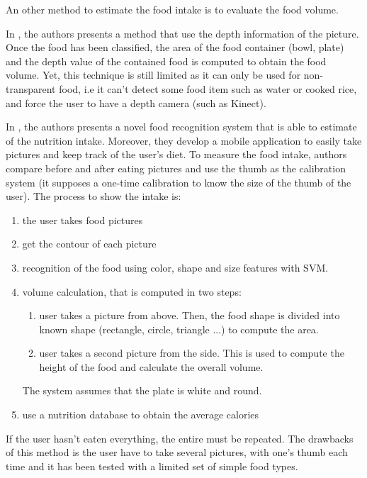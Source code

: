 
An other method to estimate the food intake is to evaluate the food volume.

In \cite{Chen2012}, the authors presents a method that use the depth information of the picture. Once the food has been classified, the area of the food container (bowl, plate) and the depth value of the contained food is computed to obtain the food volume.
Yet, this technique is still limited as it can only be used for non-transparent food, i.e it can't detect some food item such as water or cooked rice, and force the user to have a depth camera (such as Kinect).

In \cite{Almaghrabi2012a}, the authors presents a novel food recognition system that is able to estimate of the nutrition intake. Moreover, they develop a mobile application to easily take pictures and keep track of the user's diet.
To measure the food intake, authors compare before and after eating pictures and use the thumb as the calibration system (it supposes a one-time calibration to know the size of the thumb of the user).
The process to show the intake is:
\begin{enumerate}
    \item the user takes food pictures
    \item get the contour of each picture
    \item recognition of the food using color, shape and size features with SVM.
    \item volume calculation, that is computed in two steps:
    \begin{enumerate}
        \item user takes a picture from above. Then, the food shape is divided into known shape (rectangle, circle, triangle ...) to compute the area.
        \item user takes a second picture from the side. This is used to compute the height of the food and calculate the overall volume.
    \end{enumerate}
    The system assumes that the plate is white and round.
    \item use a nutrition database to obtain the average calories
\end{enumerate}
If the user hasn't eaten everything, the entire must be repeated.
The drawbacks of this method is the user have to take several pictures, with one's thumb each time and it has been tested with a limited set of simple food types.


